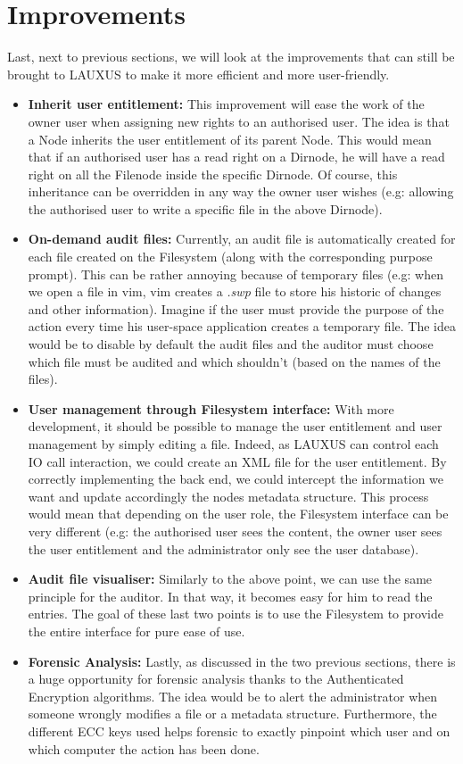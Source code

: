 \documentclass[../main.tex]{subfiles}
\begin{document}
\section{Improvements}
\label{section:analysis:improvements}
\par Last, next to previous sections, we will look at the improvements that can still be brought to LAUXUS to make it more efficient and more user-friendly.
\begin{itemize}
    \item \textbf{Inherit user entitlement:} This improvement will ease the work of the owner user when assigning new rights to an authorised user. The idea is that a Node inherits the user entitlement of its parent Node. This would mean that if an authorised user has a read right on a Dirnode, he will have a read right on all the Filenode inside the specific Dirnode. Of course, this inheritance can be overridden in any way the owner user wishes (e.g: allowing the authorised user to write a specific file in the above Dirnode).
    \item \textbf{On-demand audit files:} Currently, an audit file is automatically created for each file created on the Filesystem (along with the corresponding purpose prompt). This can be rather annoying because of temporary files (e.g: when we open a file in vim, vim creates a \textit{.swp} file to store his historic of changes and other information). Imagine if the user must provide the purpose of the action every time his user-space application creates a temporary file. The idea would be to disable by default the audit files and the auditor must choose which file must be audited and which shouldn't (based on the names of the files).
    \item \textbf{User management through Filesystem interface:} With more development, it should be possible to manage the user entitlement and user management by simply editing a file. Indeed, as LAUXUS can control each IO call interaction, we could create an XML file for the user entitlement. By correctly implementing the back end, we could intercept the information we want and update accordingly the nodes metadata structure. This process would mean that depending on the user role, the Filesystem interface can be very different (e.g: the authorised user sees the content, the owner user sees the user entitlement and the administrator only see the user database).
    \item \textbf{Audit file visualiser:} Similarly to the above point, we can use the same principle for the auditor. In that way, it becomes easy for him to read the entries. The goal of these last two points is to use the Filesystem to provide the entire interface for pure ease of use.
    \item \textbf{Forensic Analysis:} Lastly, as discussed in the two previous sections, there is a huge opportunity for forensic analysis thanks to the Authenticated Encryption algorithms. The idea would be to alert the administrator when someone wrongly modifies a file or a metadata structure. Furthermore, the different ECC keys used helps forensic to exactly pinpoint which user and on which computer the action has been done.
\end{itemize}

    
\end{document}
